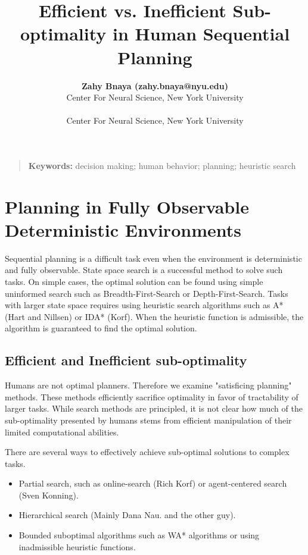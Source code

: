 \documentclass[10pt,letterpaper]{article}
\title{Efficient vs. Inefficient Sub-optimality in Human Sequential Planning}
\author{{\large \bf Zahy Bnaya (zahy.bnaya@nyu.edu)} \\
Center For Neural Science, New York University\\
  \AND {\large \bf Weiji Ma (weiji.ma@nyu.edu)} \\
Center For Neural Science, New York University\\
}
\begin{document}
\maketitle


\begin{quote}
\small
\textbf{Keywords:} 
decision making; human behavior; planning; heuristic search
\end{quote}

\section{Planning in Fully Observable Deterministic Environments}

Sequential planning is a difficult task even when the environment is deterministic and fully observable.
State space search is a successful method to solve such tasks.  
On simple cases, the optimal solution can be found using simple uninformed search such as Breadth-First-Search or Depth-First-Search. 
Tasks with larger state space requires using heuristic search algorithms such as A* (Hart and Nillsen) or IDA* (Korf). When the heuristic function is admissible, the algorithm is guaranteed to find the optimal solution.


\subsection{Efficient and Inefficient sub-optimality}

Humans are not optimal planners.  Therefore we examine "satisficing planning" methods. These methods efficiently sacrifice optimality in favor of tractability of larger tasks. While search methods are principled, it is not clear how much of the sub-optimality presented by humans stems from efficient manipulation of their limited computational abilities.

There are several ways to effectively achieve sub-optimal solutions to complex tasks. 

\begin{itemize}
	\item Partial search, such as online-search (Rich Korf) or agent-centered search  (Sven Konning).
	\item Hierarchical search (Mainly Dana Nau. and the other guy). 
	\item Bounded suboptimal algorithms such as WA* algorithms or using inadmissible heuristic functions.
\end{itemize}
\end{document}
